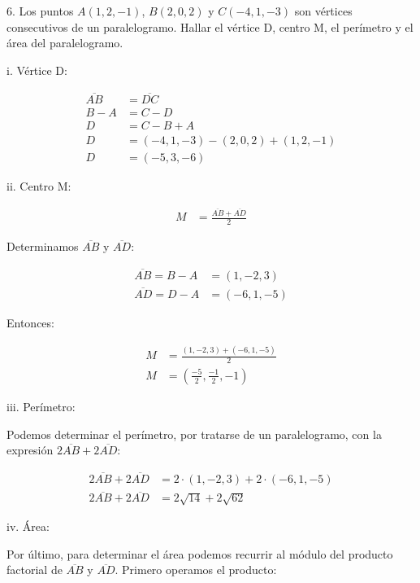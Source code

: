 \documentclass{article}
\begin{document}
6. Los puntos $A (1,2,-1)$, $B(2,0,2)$ y $C(-4,1,-3)$ son vértices consecutivos
de un paralelogramo. Hallar el vértice D, centro M, el perímetro y el área del
paralelogramo.

i. Vértice D:

\begin{align*}
    \overline{AB} & = \overline{DC}                        \\
    B - A         & = C - D                                \\
    D             & = C - B + A                            \\
    D             & = (-4, 1, -3) - (2, 0, 2) + (1, 2, -1) \\
    D             & = (-5, 3, -6)
\end{align*}

ii. Centro M:

\begin{align*}
    M & = \frac{\overline{AB} + \overline{AD}}{2}
\end{align*}

Determinamos $\overline{AB}$ y $\overline{AD}$:

\begin{align*}
    \overline{AB} = B - A & = (1, -2, 3)  \\
    \overline{AD} = D - A & = (-6, 1, -5)
\end{align*}

Entonces:

\begin{align*}
    M & = \frac{(1, -2, 3) + (-6, 1, -5)}{2}                  \\
    M & = \boxed{\left(\frac{-5}{2}, \frac{-1}{2}, -1\right)}
\end{align*}

iii. Perímetro:

Podemos determinar el perímetro, por tratarse de un paralelogramo, con la
expresión $2\overline{AB} + 2\overline{AD}$:

\begin{align*}
    2\overline{AB} + 2\overline{AD} & = 2 \cdot (1, -2, 3) + 2 \cdot (-6, 1, -5) \\
    2\overline{AB} + 2\overline{AD} & = \boxed{2 \sqrt{14} + 2 \sqrt{62}}
\end{align*}

iv. Área:

Por último, para determinar el área podemos recurrir al módulo del producto
factorial de $\overline{AB}$ y $\overline{AD}$. Primero operamos el producto:
\end{document}
